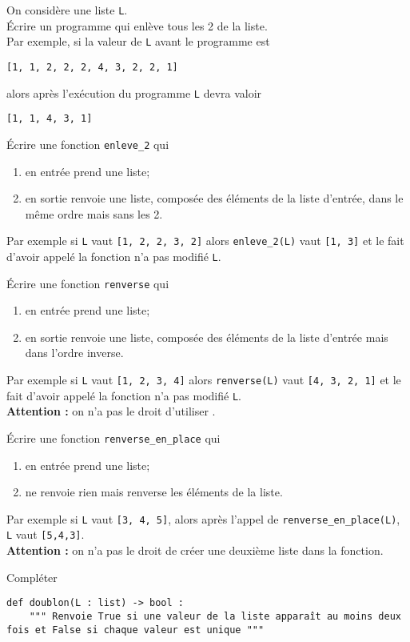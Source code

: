 \documentclass[a4paper,12pt,french]{book}
\begin{document}

\begin{exercice}
On considère une liste \texttt{L}.\\
\'Ecrire un programme qui enlève tous les 2 de la liste.\\

Par exemple, si la valeur de \texttt{L} avant le programme est \begin{center}
\texttt{[1, 1, 2, 2, 2, 4, 3, 2, 2, 1]}
\end{center} alors après l'exécution du programme \texttt{L} devra valoir \begin{center}
\texttt{[1, 1, 4, 3, 1]}
\end{center}
\end{exercice}

\begin{exercice}
\'Ecrire une fonction \texttt{enleve\_2} qui \begin{enumerate}[--]
	\item en entrée prend une liste;
    \item en sortie renvoie une liste, composée des éléments de la liste d'entrée, dans le même ordre mais sans les 2.
\end{enumerate}
Par exemple si \texttt{L} vaut \texttt{[1, 2, 2, 3, 2]} alors \texttt{enleve\_2(L)} vaut \texttt{[1, 3]} et le fait d'avoir appelé la fonction n'a pas modifié \texttt{L}.
\end{exercice}

\begin{exercice}
\'Ecrire une fonction \texttt{renverse} qui \begin{enumerate}[--]
	\item en entrée prend une liste;
    \item en sortie renvoie une liste, composée des éléments de la liste d'entrée mais dans l'ordre inverse.
\end{enumerate}
Par exemple si \texttt{L} vaut \texttt{[1, 2, 3, 4]} alors \texttt{renverse(L)} vaut \texttt{[4, 3, 2, 1]} et le fait d'avoir appelé la fonction n'a pas modifié \texttt{L}.\\

\textbf{Attention :} on n'a pas le droit d'utiliser .
\end{exercice}

\begin{exercice}
\'Ecrire une fonction \texttt{renverse\_en\_place} qui
\begin{enumerate}[--]
	\item en entrée prend une liste;
    \item ne renvoie rien mais renverse les éléments de la liste.
\end{enumerate}
Par exemple si \texttt{L} vaut \texttt{[3, 4, 5]}, alors après l'appel de \texttt{renverse\_en\_place(L)}, \texttt{L} vaut \texttt{[5,4,3]}.\\

\textbf{Attention :} on n'a pas le droit de créer une deuxième liste dans la fonction.
\end{exercice}

\begin{exercice}
Compléter
\begin{verbatim}
def doublon(L : list) -> bool :
    """ Renvoie True si une valeur de la liste apparaît au moins deux fois et False si chaque valeur est unique """
\end{verbatim}
\end{exercice}
\end{document}
